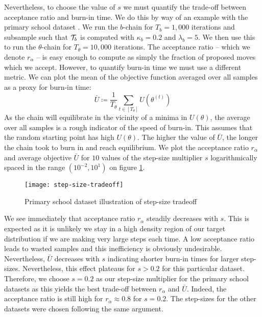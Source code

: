 Nevertheless, to choose the value of $s$ we must quantify the trade-off between acceptance ratio and burn-in time. We do this by way of an example with the primary school dataset \cite{schools}. We run the $b$-chain for $T_b = 1,000$ iterations and subsample such that $\mathcal{T}_b$ is computed with $\kappa_b=0.2$ and $\lambda_b=5$. We then use this to run the $\theta$-chain for $T_\theta = 10,000$ iterations. The acceptance ratio -- which we denote $r_\alpha$ -- is easy enough to compute as simply the fraction of proposed moves which we accept. However, to quantify burn-in time we must use a different metric. We can plot the mean of the objective function averaged over all samples as a proxy for burn-in time:
%
\begin{equation}
	\bar{U} \coloneqq \frac{1}{T_\theta} \sum_{t \in [T_\theta]} U\left( \theta^{(t)} \right)
\end{equation}
%
As the chain will equilibrate in the vicinity of a minima in $U(\theta)$, the average over all samples is a rough indicator of the speed of burn-in. This assumes that the random starting point has high $U(\theta)$. The higher the value of $\bar{U}$, the longer the chain took to burn in and reach equilibrium. We plot the acceptance ratio $r_\alpha$ and average objective $\bar{U}$ for $10$ values of the step-size multiplier $s$ logarithmically spaced in the range $(10^{-2}, 10^1)$ on figure \ref{fig:step-size-tradeoff}.
%
\begin{figure}[!h]
	\centering
	\texttt{[image: step-size-tradeoff]}
	\caption{Primary school dataset \cite{schools} illustration of step-size tradeoff}
	\label{fig:step-size-tradeoff}
\end{figure}

We see immediately that acceptance ratio $r_\alpha$ steadily decreases with $s$. This is expected as it is unlikely we stay in a high density region of our target distribution if we are making very large steps each time. A low acceptance ratio leads to wasted samples and this inefficiency is obviously undesirable. Nevertheless, $\bar{U}$ decreases with $s$ indicating shorter burn-in times for larger step-sizes. Nevertheless, this effect plateaus for $s>0.2$ for this particular dataset. Therefore, we choose $s=0.2$ as our step-size multiplier for the primary school datasets as this yields the best trade-off between $r_\alpha$ and $\bar{U}$. Indeed, the acceptance ratio is still high for $r_\alpha \approx 0.8$ for $s=0.2$. The step-sizes for the other datasets were chosen following the same argument.

